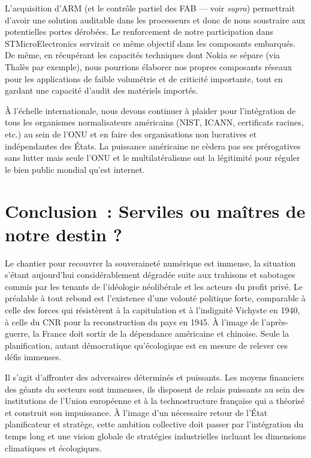 \documentclass[a4paper]{article}
\begin{document}
L’acquisition d’ARM (et le contrôle partiel des FAB –-- voir \textit{supra}) permettrait d’avoir une solution auditable dans les processeurs et donc de nous soustraire aux potentielles portes dérobées. Le renforcement de notre participation dans STMicroElectronics servirait ce même objectif dans les composants embarqués. De même, en récupérant les capacités techniques dont Nokia se sépare (via Thalès par exemple), nous pourrions élaborer nos propres composants réseaux pour les applications de faible volumétrie et de criticité importante, tout en gardant une capacité d’audit des matériels importés. 

À l’échelle internationale, nous devons continuer à plaider pour l’intégration de tous les organismes normalisateurs américains (NIST, ICANN, certificats racines, etc.) au sein de l’ONU et en faire des organisations non lucratives et indépendantes des États. La puissance américaine ne cèdera pas ses prérogatives sans lutter mais seule l’ONU et le multilatéralisme ont la légitimité pour réguler le bien public mondial qu’est internet.

\section*{Conclusion~: Serviles ou maîtres de notre destin ?}
Le chantier pour recouvrer la souveraineté numérique est immense, la situation s'étant aujourd'hui considérablement dégradée suite aux trahisons et sabotages commis par les tenants de l'idéologie néolibérale et les acteurs du profit privé. Le préalable à tout rebond est l'existence d'une volonté politique forte, comparable à celle des forces qui résistèrent à la capitulation et à l'indignité Vichyste en 1940, à celle du CNR pour la reconstruction du pays en 1945. À l’image de l’après-guerre, la France doit sortir de la dépendance américaine et chinoise. Seule la planification, autant démocratique qu’écologique est en mesure de relever ces défis immenses.

Il s'agit d’affronter des adversaires déterminés et puissants. Les moyens financiers des géants du secteurs sont immenses, ils disposent de relais puissants au sein des institutions de l'Union européenne et à la technostructure française qui a théorisé et construit son impuissance. À l’image d'un nécessaire retour de l’État planificateur et stratège\cite{interet2020servicespublics}, cette ambition collective doit passer par l'intégration du temps long et une vision globale de stratégies industrielles incluant les dimensions climatiques et écologiques. 
 
\end{document}
